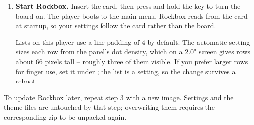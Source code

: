 \begin{enumerate}
\item \textbf{Start Rockbox.} Insert the card, then press and hold the
  \ButtonPower{} key to turn the board on. The player boots to the main menu.
  Rockbox reads  from the card at startup, so your
  settings follow the card rather than the board.

  Lists on this player use a line padding of 4 by default. The automatic setting
  sizes each row from the panel's dot density, which on a 2.0" screen gives rows
  about 66 pixels tall -- roughly three of them visible. If you prefer larger
  rows for finger use, set it under
  ; the list is a setting, so the change survives a reboot.

\end{enumerate}

To update Rockbox later, repeat step 3 with a new image. Settings and the
theme files are untouched by that step; overwriting them requires the
corresponding zip to be unpacked again.
